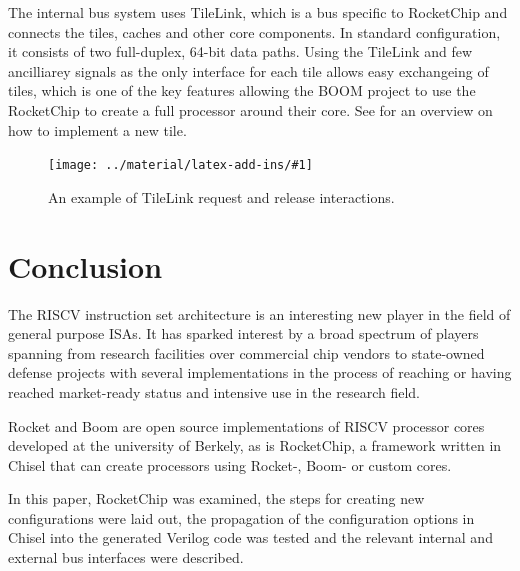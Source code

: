 \documentclass[journal,a4paper]{IEEEtran}
\newcommand*{\COMPILEIMAGES}{}%
\newcommand\inputimage[1]{%
	\ifdefined\COMPILEIMAGES
		
	\else
		\texttt{[image: ../material/latex-add-ins/\#1]}
	\fi
}
\begin{document}
The internal bus system uses TileLink, which is a bus specific to RocketChip and connects the tiles, caches and other core components.
In standard configuration, it consists of two full-duplex, 64-bit data paths.
Using the TileLink and few ancilliarey signals as the only interface for each tile allows easy exchangeing of tiles, which is one of the key features allowing the BOOM project to use the RocketChip to create a full processor around their core.
See \cite{rcgen-tutorial} for an overview on how to implement a new tile.






\begin{figure}%
	\centering
	\inputimage{image3}
	\caption{An example of TileLink request and release interactions.}
	\label{til-transfer}
\end{figure}



\vspace{2cm}
\lipsum















\section{Conclusion}
The RISCV instruction set architecture is an interesting new player in the field of general purpose ISAs.
It has sparked interest by a broad spectrum of players spanning from research facilities over commercial chip vendors to state-owned defense projects with several implementations in the process of reaching or having reached market-ready status and intensive use in the research field.

Rocket and Boom are open source implementations of RISCV processor cores developed at the university of Berkely, as is RocketChip, a framework written in Chisel that can create processors using Rocket-, Boom- or custom cores.

In this paper, RocketChip was examined, the steps for creating new configurations were laid out, the propagation of the configuration options in Chisel into the generated Verilog code was tested and the relevant internal and external bus interfaces were described.
\end{document}
